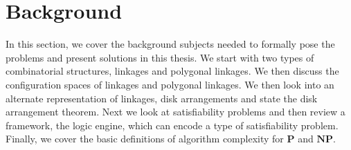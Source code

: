 \chapter{Background}
In this section, we cover the background subjects needed to formally pose the 
problems and present solutions in this thesis.  We start with two types of combinatorial structures, linkages 
and polygonal linkages.  We then discuss the configuration spaces of linkages and polygonal 
linkages.   We then look into an alternate representation of linkages, disk arrangements and state 
the disk arrangement theorem.  Next we look at satisfiability problems and then review a framework, the 
logic engine, which can encode a type of satisfiability problem.  Finally, we cover the basic 
definitions of algorithm complexity for $\textbf{P}$ and $\textbf{NP}$.
